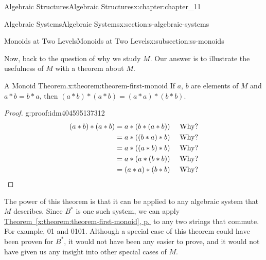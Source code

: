 \documentclass[twoside,10pt,]{book}
\newcommand{\xreffont}{\relax}
\newcommand{\qedhere}{\relax}
\numberwithin{equation}{section}
\begin{document}
\begin{chapterptx}{Algebraic Structures}{}{Algebraic Structures}{}{}{x:chapter:chapter_11}
\begin{sectionptx}{Algebraic Systems}{}{Algebraic Systems}{}{}{x:section:s-algebraic-systems}
\begin{subsectionptx}{Monoids at Two Levels}{}{Monoids at Two Levels}{}{}{x:subsection:ss-monoids}
\par
Now, back to the question of why we study \(M\). Our answer is to illustrate the usefulness of \(M\) with a theorem about \(M\).%
\begin{theorem}{A Monoid Theorem.}{}{x:theorem:theorem-first-monoid}%
If \(a\), \(b\) are elements of \(M\) and \(a * b = b * a\), then \((a * b) * (a * b) = (a * a) * (b * b)\).%
\end{theorem}
\begin{proof}{}{g:proof:idm404595137312}
%
\begin{equation*}
\begin{split}
(a*b)*(a*b) &=a*(b*(a*b))\quad \textrm{   Why?} \\
&=a* ((b*a)*b)\quad \textrm{   Why?}\\
&= a*((a*b)*b)\quad \textrm{   Why?}\\
&= a*(a*(b*b))\quad \textrm{   Why?}\\ 
&= (a*a)*(b*b)\quad \textrm{   Why?}
\end{split}\qedhere
\end{equation*}
%
\end{proof}
The power of this theorem is that it can be applied to any algebraic system that \(M\) describes. Since \(B^*\) is one such system, we can apply \hyperref[x:theorem:theorem-first-monoid]{Theorem~{\xreffont\ref{x:theorem:theorem-first-monoid}}, p.\,\pageref{x:theorem:theorem-first-monoid}} to any two strings that commute. For example, 01 and 0101. Although a special case of this theorem could have been proven for \(B^*\), it would not have been any easier to prove, and it would not have given us any insight into other special cases of \(M\).%
\end{subsectionptx}
\end{sectionptx}
\end{chapterptx}
\end{document}
